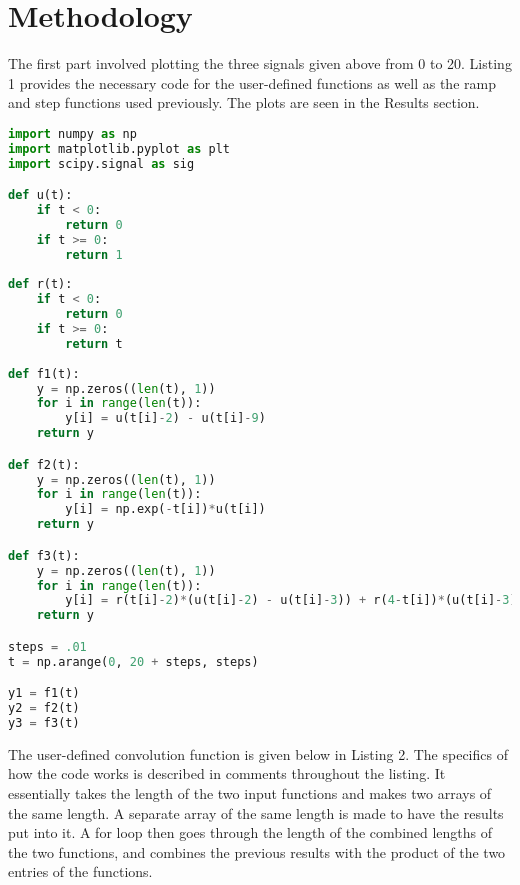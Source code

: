 \documentclass[12pt]{report}
\begin{document}
\section{Methodology}
The first part involved plotting the three signals given above from 0 to 20. Listing 1 provides the necessary code for the user-defined functions as well as the ramp and step functions used previously. The plots are seen in the Results section.
\begin{lstlisting}[language=Python, caption=Defining the functions to plot the three signals from 0 \textless{} t \textless{} 20]
import numpy as np
import matplotlib.pyplot as plt
import scipy.signal as sig

def u(t):
    if t < 0:
        return 0
    if t >= 0:
        return 1
    
def r(t):
    if t < 0:
        return 0
    if t >= 0:
        return t
    
def f1(t):
    y = np.zeros((len(t), 1))
    for i in range(len(t)):
        y[i] = u(t[i]-2) - u(t[i]-9)
    return y

def f2(t):
    y = np.zeros((len(t), 1))
    for i in range(len(t)):
        y[i] = np.exp(-t[i])*u(t[i])
    return y

def f3(t):
    y = np.zeros((len(t), 1))
    for i in range(len(t)):
        y[i] = r(t[i]-2)*(u(t[i]-2) - u(t[i]-3)) + r(4-t[i])*(u(t[i]-3) - u(t[i]-4))
    return y

steps = .01
t = np.arange(0, 20 + steps, steps)

y1 = f1(t)
y2 = f2(t)
y3 = f3(t)
\end{lstlisting}

The user-defined convolution function is given below in Listing 2. The specifics of how the code works is described in comments throughout the listing. It essentially takes the length of the two input functions and makes two arrays of the same length. A separate array of the same length is made to have the results put into it. A for loop then goes through the length of the combined lengths of the two functions, and combines the previous results with the product of the two entries of the functions.
\end{document}
